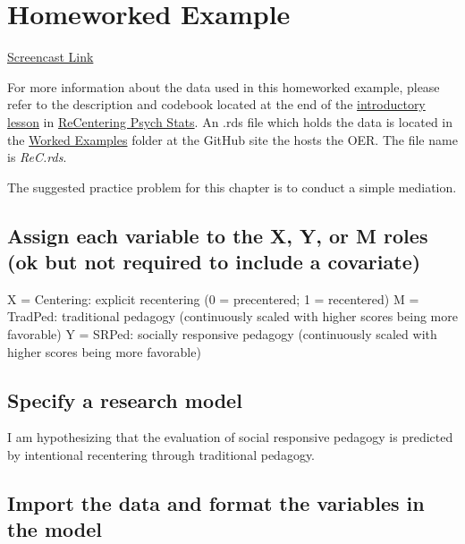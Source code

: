 \documentclass[
  11pt,
]{book}
\begin{document}
\hypertarget{homeworked-example-2}{%
\section{Homeworked Example}\label{homeworked-example-2}}

\href{https://youtu.be/hXTFPSQrjpQ}{Screencast Link}

For more information about the data used in this homeworked example, please refer to the description and codebook located at the end of the \href{https://lhbikos.github.io/ReCenterPsychStats/ReCintro.html\#introduction-to-the-data-set-used-for-homeworked-examples}{introductory lesson} in \href{https://lhbikos.github.io/ReCenterPsychStats/}{ReCentering Psych Stats}. An .rds file which holds the data is located in the \href{https://github.com/lhbikos/ReC_MultivModel/tree/main/Worked_Examples}{Worked Examples} folder at the GitHub site the hosts the OER. The file name is \emph{ReC.rds}.

The suggested practice problem for this chapter is to conduct a simple mediation.

\hypertarget{assign-each-variable-to-the-x-y-or-m-roles-ok-but-not-required-to-include-a-covariate}{%
\subsection{Assign each variable to the X, Y, or M roles (ok but not required to include a covariate)}\label{assign-each-variable-to-the-x-y-or-m-roles-ok-but-not-required-to-include-a-covariate}}

X = Centering: explicit recentering (0 = precentered; 1 = recentered) M = TradPed: traditional pedagogy (continuously scaled with higher scores being more favorable) Y = SRPed: socially responsive pedagogy (continuously scaled with higher scores being more favorable)

\hypertarget{specify-a-research-model-2}{%
\subsection*{Specify a research model}\label{specify-a-research-model-2}}


I am hypothesizing that the evaluation of social responsive pedagogy is predicted by intentional recentering through traditional pedagogy.

\hypertarget{import-the-data-and-format-the-variables-in-the-model}{%
\subsection*{Import the data and format the variables in the model}\label{import-the-data-and-format-the-variables-in-the-model}}
\end{document}
